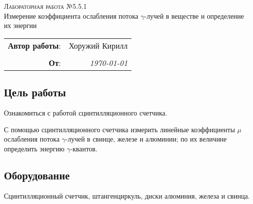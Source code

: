 
\phantom{42}
\vspace{20mm}

\begin{center}
    \LARGE \textsc{Лабораторная работа №5.5.1} \\
    \vspace{3 mm}
    \large Измерение коэффициента ослабления потока $\gamma$-лучей в веществе и определение их энергии
\end{center}


\phantom{42}

\begin{flushright}
    \begin{tabular}{rr}
        \textbf{Автор работы}: 
        & Хоружий Кирилл \\
        & \\
        \textbf{От}: &
        \textit{\today}\\
    \end{tabular}
\end{flushright}

\thispagestyle{empty}

\vspace{10mm}


\subsection*{Цель работы}
\begin{enumerate*}
    \item Ознакомиться с работой сцинтилляционного счетчика.
    \item  С помощью сцинтилляционного счетчика измерить линейные коэффициенты $\mu$ ослабления потока $ \gamma $-лучей в свинце, железе и алюминии; по их величине определить энергию $ \gamma $-квантов.
\end{enumerate*}


\subsection*{Оборудование}
Сцинтилляционный счетчик, штангенциркуль, диски алюминия, железа и свинца. 



\newpage
